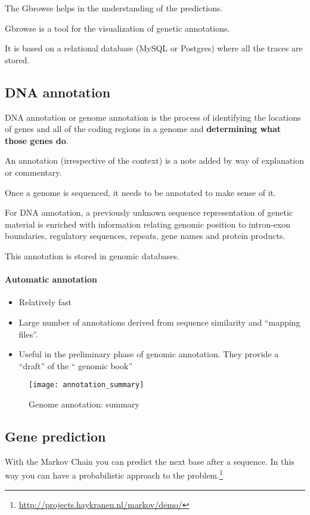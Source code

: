 The Gbrowse helps in the understanding of the predictions.

Gbrowse is a tool for the visualization of genetic annotations.

It is based on a relational database (MySQL or Postgres) where all the traces
are stored.

\subsection{DNA annotation}

DNA annotation or genome annotation is the process of identifying the
locations of genes and all of the coding regions in a genome and
\textbf{determining what those genes do}.

An annotation (irrespective of the context) is a note added by way of
explanation or commentary.

Once a genome is sequenced, it needs to be annotated to make sense of it.

For DNA annotation, a previously unknown sequence representation of genetic
material is enriched with information relating genomic position to intron-exon
boundaries, regulatory sequences, repeats, gene names and protein products.

This annotation is stored in genomic databases.

\paragraph{Automatic annotation}

\begin{itemize}
 \item Relatively fast
 \item Large number of annotations derived from sequence similarity and
``mapping files''.
 \item Useful in the preliminary phase of genomic annotation. They provide a
``draft'' of the `` genomic book''
\end{itemize}

\begin{figure}[H]
  \centering
  \texttt{[image: annotation\_summary]}
  \caption{Genome annotation: summary}
  \label{fig:annotation_summary}
\end{figure}

\subsection{Gene prediction}
With the Markov Chain you can predict the next base after a sequence. In this 
way you can have a probabilistic approach to the 
problem.\footnote{\url{http://projects.haykranen.nl/markov/demo/}}
